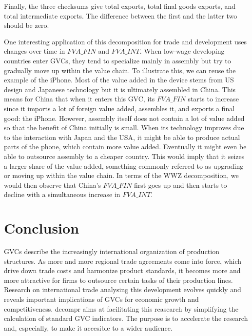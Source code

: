 \documentclass[a4paper]{article}\usepackage[]{graphicx}\usepackage[]{color}
\begin{document}
Finally, the three checksums give total exports, total final goods exports, and total intermediate exports. 
The difference between the first and the latter two should be zero.

One interesting application of this decomposition for trade and development uses changes over time in $FVA\_FIN$ and $FVA\_INT$. 
When low-wage developing countries enter GVCs, they tend to specialize mainly in assembly but try to gradually move up within the value chain.    
To illustrate this, we can reuse the example of the iPhone. 
Most of the value added in the device stems from US design and Japanese technology but it is ultimately assembled in China.
This means for China that when it enters this GVC, its $FVA\_FIN$ starts to increase since it imports a lot of foreign value added, assembles it, and exports a final good: the iPhone.
However, assembly itself does not contain a lot of value added so that the benefit of China initially is small. 
When its technology improves due to the interaction with Japan and the USA, it might be able to produce actual parts of the phone,
which contain more value added.
Eventually it might even be able to outsource assembly to a cheaper country.
This would imply that it seizes a larger share of the value added, something commonly referred to as upgrading or moving up within the value chain.
In terms of the WWZ decomposition, we would then observe that China's $FVA\_FIN$ first goes up and then starts to decline with
a simultaneous increase in $FVA\_INT$.


\section{Conclusion}
\label{sec:conclusion}

GVCs describe the increasingly international organization of production structures.
As more and more regional trade agreements come into force, 
which drive down trade costs and harmonize product standards,
it becomes more and more attractive for firms to outsource certain tasks of their production lines.
Research on international trade analysing this development evolves quickly and reveals important implications of GVCs for economic growth and competitiveness.  
decompr aims at facilitating this reasearch by simplifying the calculation of standard GVC indicators.
The purpose is to accelerate the research and, especially, to make it accesible to a wider audience.
\end{document}
